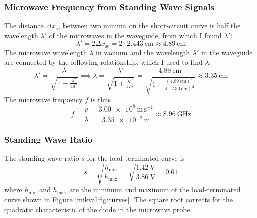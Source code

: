\documentclass[11pt, a4paper]{article}
\begin{document}
\subsubsection{Microwave Frequency from Standing Wave Signals}
The distance $ \Delta x_{\text{sc}} $ between two minima on the short-circuit curve is half the wavelength $ \lambda' $ of the microwaves in the waveguide, from which I found $ \lambda' $:
\begin{equation*}
	\lambda' = 2 \Delta x_{\text{sc}} = 2 \cdot \SI{2.443}{\centi \meter} \approx \SI{4.89}{\centi \meter}
\end{equation*}
The microwave wavelength $ \lambda $ in vacuum and the wavelength $ \lambda' $ in the waveguide are connected by the following relationship, which I used to find $ \lambda $:
\begin{equation*}
	\lambda' = \frac{\lambda}{\sqrt{1 - \frac{\lambda^{2}}{4a^{2}}}} \implies 	\lambda = \frac{\lambda'}{\sqrt{1 + \frac{\lambda'^{2}}{4a^{2}}}} = \frac{\SI{4.89}{\centi \meter}}{\sqrt{1 + \frac{(\SI{4.89}{\centi \meter})^{2}}{4(\SI{2.30}{\centi \meter})^{2}}}} \approx \SI{3.35}{\centi \meter}
\end{equation*}
The microwave frequency $ f $ is thus
\begin{equation*}
	f = \frac{c}{\lambda} = \frac{\SI{3.00e8}{\meter \, \second^{-1}}}{\SI{3.35e-2}{\meter}} \approx \SI{8.96}{\giga \hertz}
\end{equation*}


\subsubsection{Standing Wave Ratio}
The standing wave ratio $ s $ for the load-terminated curve is
\begin{equation*}
	s = \sqrt{\frac{h_{\text{min}}}{h_{\text{max}}}} = \sqrt{\frac{\SI{1.42}{\volt}}{\SI{3.86}{\volt}}} = 0.61
\end{equation*}
where $ h_{\text{min}} $ and $ h_{\text{max}} $ are the minimum and maximum of the load-terminated curve shown in Figure \ref{mikval:fig:curves}. The square root corrects for the quadratic characteristic of the diode in the microwave probe.
\end{document}
